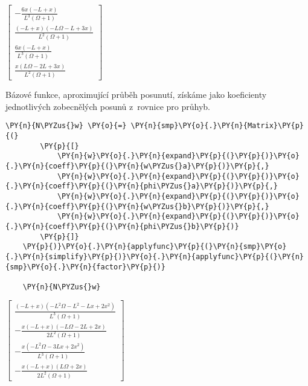                 
    
    $\displaystyle \left[\begin{matrix}- \frac{6 x \left(- L + x\right)}{L^{3} \left(\Omega + 1\right)}\\\frac{\left(- L + x\right) \left(- L \Omega - L + 3 x\right)}{L^{2} \left(\Omega + 1\right)}\\\frac{6 x \left(- L + x\right)}{L^{3} \left(\Omega + 1\right)}\\\frac{x \left(L \Omega - 2 L + 3 x\right)}{L^{2} \left(\Omega + 1\right)}\end{matrix}\right]$

\vspace{0.3cm}
Bázové funkce, aproximující průběh posunutí, získáme jako koeficienty jednotlivých zobecnělých posunů z~rovnice pro průhyb.
        
    
\begin{tcolorbox}[breakable, size=fbox, boxrule=1pt, pad at break*=1mm,colback=cellbackground, colframe=cellborder]
    \begin{Verbatim}[commandchars=\\\{\}]
    \PY{n}{N\PYZus{}w} \PY{o}{=} \PY{n}{smp}\PY{o}{.}\PY{n}{Matrix}\PY{p}{(}
        \PY{p}{[}
            \PY{n}{w}\PY{o}{.}\PY{n}{expand}\PY{p}{(}\PY{p}{)}\PY{o}{.}\PY{n}{coeff}\PY{p}{(}\PY{n}{w\PYZus{}a}\PY{p}{)}\PY{p}{,}
            \PY{n}{w}\PY{o}{.}\PY{n}{expand}\PY{p}{(}\PY{p}{)}\PY{o}{.}\PY{n}{coeff}\PY{p}{(}\PY{n}{phi\PYZus{}a}\PY{p}{)}\PY{p}{,}
            \PY{n}{w}\PY{o}{.}\PY{n}{expand}\PY{p}{(}\PY{p}{)}\PY{o}{.}\PY{n}{coeff}\PY{p}{(}\PY{n}{w\PYZus{}b}\PY{p}{)}\PY{p}{,}
            \PY{n}{w}\PY{o}{.}\PY{n}{expand}\PY{p}{(}\PY{p}{)}\PY{o}{.}\PY{n}{coeff}\PY{p}{(}\PY{n}{phi\PYZus{}b}\PY{p}{)}
        \PY{p}{]}
    \PY{p}{)}\PY{o}{.}\PY{n}{applyfunc}\PY{p}{(}\PY{n}{smp}\PY{o}{.}\PY{n}{simplify}\PY{p}{)}\PY{o}{.}\PY{n}{applyfunc}\PY{p}{(}\PY{n}{smp}\PY{o}{.}\PY{n}{factor}\PY{p}{)}
    
    \PY{n}{N\PYZus{}w}
    \end{Verbatim}
\end{tcolorbox}
     
                
    
    $\displaystyle \left[\begin{matrix}\frac{\left(- L + x\right) \left(- L^{2} \Omega - L^{2} - L x + 2 x^{2}\right)}{L^{3} \left(\Omega + 1\right)}\\- \frac{x \left(- L + x\right) \left(- L \Omega - 2 L + 2 x\right)}{2 L^{2} \left(\Omega + 1\right)}\\- \frac{x \left(- L^{2} \Omega - 3 L x + 2 x^{2}\right)}{L^{3} \left(\Omega + 1\right)}\\- \frac{x \left(- L + x\right) \left(L \Omega + 2 x\right)}{2 L^{2} \left(\Omega + 1\right)}\end{matrix}\right]$
    
